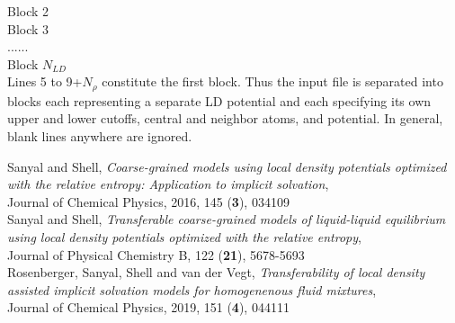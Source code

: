 \documentclass[10pt]{article}
\begin{document}
\noindent Block 2\\

\noindent Block 3\\

\noindent ......\\

\noindent Block $N_{LD}$\\

\noindent Lines 5 to 9+$N_\rho$ constitute the first block. Thus the input file is separated into blocks each representing a separate LD potential and each specifying its own upper and lower cutoffs, central and neighbor atoms, and potential.  In general, blank lines anywhere are ignored. 
%
%
%
%
\begin{thebibliography}

  Sanyal and Shell, \emph{Coarse-grained models using local density potentials optimized with the relative entropy: Application to implicit solvation},\\
  Journal of Chemical Physics, 2016, 145 (\textbf{3}), 034109\\
  

  Sanyal and Shell, \emph{Transferable coarse-grained models of liquid-liquid equilibrium using local density potentials optimized with the relative entropy},\\
  Journal of Physical Chemistry B, 122 (\textbf{21}), 5678-5693\\
  
  Rosenberger, Sanyal, Shell and van der Vegt, \emph{Transferability of local density assisted implicit solvation models for homogenenous fluid mixtures},\\
  Journal of Chemical Physics, 2019, 151 (\textbf{4}), 044111

\end{thebibliography}
\end{document}
